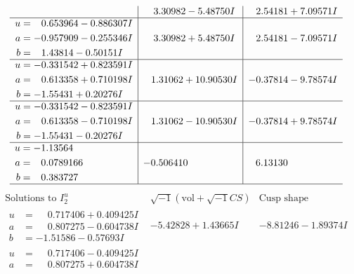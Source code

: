 \documentclass[1p]{elsarticle_modified}
\theoremstyle{definition}
\newcommand{\I}{\sqrt{-1}}
\begin{document}
$$\begin{array}{c|c|c}
 & \phantom{-}3.30982 - 5.48750 I & \phantom{-}2.54181 + 7.09571 I \\ \hline\begin{aligned}
u &= \phantom{-}0.653964 - 0.886307 I \\
a &= -0.957909 - 0.255346 I \\
b &= \phantom{-}1.43814 - 0.50151 I\end{aligned}
 & \phantom{-}3.30982 + 5.48750 I & \phantom{-}2.54181 - 7.09571 I \\ \hline\begin{aligned}
u &= -0.331542 + 0.823591 I \\
a &= \phantom{-}0.613358 + 0.710198 I \\
b &= -1.55431 + 0.20276 I\end{aligned}
 & \phantom{-}1.31062 + 10.90530 I & -0.37814 - 9.78574 I \\ \hline\begin{aligned}
u &= -0.331542 - 0.823591 I \\
a &= \phantom{-}0.613358 - 0.710198 I \\
b &= -1.55431 - 0.20276 I\end{aligned}
 & \phantom{-}1.31062 - 10.90530 I & -0.37814 + 9.78574 I \\ \hline\begin{aligned}
u &= -1.13564\phantom{ +0.000000I} \\
a &= \phantom{-}0.0789166\phantom{ +0.000000I} \\
b &= \phantom{-}0.383727\phantom{ +0.000000I}\end{aligned}
 & -0.506410\phantom{ +0.000000I} & \phantom{-}6.13130\phantom{ +0.000000I}\\
 \hline 
 \end{array}$$\newpage$$\begin{array}{c|c|c}  
\text{Solutions to }I^u_{2}& \I (\text{vol} + \sqrt{-1}CS) & \text{Cusp shape}\\
 \hline 
\begin{aligned}
u &= \phantom{-}0.717406 + 0.409425 I \\
a &= \phantom{-}0.807275 - 0.604738 I \\
b &= -1.51586 - 0.57693 I\end{aligned}
 & -5.42828 + 1.43665 I & -8.81246 - 1.89374 I \\ \hline\begin{aligned}
u &= \phantom{-}0.717406 - 0.409425 I \\
a &= \phantom{-}0.807275 + 0.604738 I \\

\end{aligned}
\end{array}$$
\end{document}
